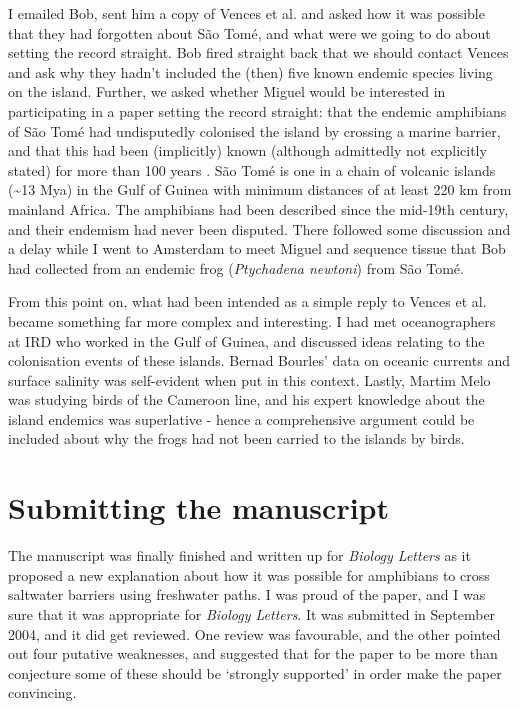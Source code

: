 \documentclass[
]{krantz}
\begin{document}
I emailed Bob, sent him a copy of Vences et al. \citeyearpar{vences2003multiple} and asked how it was possible that they had forgotten about São Tomé, and what were we going to do about setting the record straight. Bob fired straight back that we should contact Vences and ask why they hadn't included the (then) five known endemic species living on the island. Further, we asked whether Miguel would be interested in participating in a paper setting the record straight: that the endemic amphibians of São Tomé had undisputedly colonised the island by crossing a marine barrier, and that this had been (implicitly) known (although admittedly not explicitly stated) for more than 100 years \citep{bocage1873melanges}. São Tomé is one in a chain of volcanic islands (\textasciitilde13 Mya) in the Gulf of Guinea with minimum distances of at least 220 km from mainland Africa. The amphibians had been described since the mid-19th century, and their endemism had never been disputed. There followed some discussion and a delay while I went to Amsterdam to meet Miguel and sequence tissue that Bob had collected from an endemic frog (\emph{Ptychadena newtoni}) from São Tomé.

From this point on, what had been intended as a simple reply to Vences et al. \citeyearpar{vences2003multiple} became something far more complex and interesting. I had met oceanographers at IRD who worked in the Gulf of Guinea, and discussed ideas relating to the colonisation events of these islands. Bernad Bourles' data on oceanic currents and surface salinity was self-evident when put in this context. Lastly, Martim Melo was studying birds of the Cameroon line, and his expert knowledge about the island endemics was superlative - hence a comprehensive argument could be included about why the frogs had not been carried to the islands by birds.

\hypertarget{submitting-the-manuscript}{%
\section{Submitting the manuscript}\label{submitting-the-manuscript}}

The manuscript was finally finished and written up for \emph{Biology Letters} as it proposed a new explanation about how it was possible for amphibians to cross saltwater barriers using freshwater paths. I was proud of the paper, and I was sure that it was appropriate for \emph{Biology Letters}. It was submitted in September 2004, and it did get reviewed. One review was favourable, and the other pointed out four putative weaknesses, and suggested that for the paper to be more than conjecture some of these should be `strongly supported' in order make the paper convincing.
\end{document}
